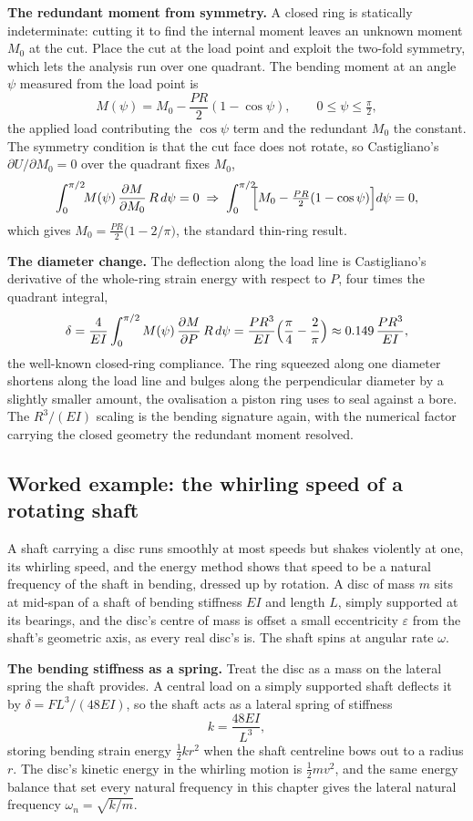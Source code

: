 \textbf{The redundant moment from symmetry.} A closed ring is statically
indeterminate: cutting it to find the internal moment leaves an unknown moment
$M_0$ at the cut. Place the cut at the load point and exploit the two-fold
symmetry, which lets the analysis run over one quadrant. The bending moment at
an angle $\psi$ measured from the load point is
\[
M(\psi) = M_0 - \frac{PR}{2}(1 - \cos\psi),
\qquad 0\le\psi\le\tfrac{\pi}{2},
\]
the applied load contributing the $\cos\psi$ term and the redundant $M_0$ the
constant. The symmetry condition is that the cut face does not rotate, so
Castigliano's $\partial U/\partial M_0 = 0$ over the quadrant fixes $M_0$,
\[
\int_0^{\pi/2}\!\! M(\psi)\,\frac{\partial M}{\partial M_0}\,R\,d\psi = 0
\;\Rightarrow\;
\int_0^{\pi/2}\!\!\Bigl[M_0 - \tfrac{PR}{2}(1-\cos\psi)\Bigr]d\psi = 0,
\]
which gives $M_0 = \tfrac{PR}{2}\bigl(1 - 2/\pi\bigr)$, the standard
thin-ring result.

\textbf{The diameter change.} The deflection along the load line is
Castigliano's derivative of the whole-ring strain energy with respect to $P$,
four times the quadrant integral,
\[
\delta = \frac{4}{EI}\int_0^{\pi/2} M(\psi)\,
\frac{\partial M}{\partial P}\,R\,d\psi
= \frac{PR^3}{EI}\Bigl(\frac{\pi}{4} - \frac{2}{\pi}\Bigr)
\approx 0.149\,\frac{PR^3}{EI},
\]
the well-known closed-ring compliance. The ring squeezed along one diameter
shortens along the load line and bulges along the perpendicular diameter by a
slightly smaller amount, the ovalisation a piston ring uses to seal against a
bore. The $R^3/(EI)$ scaling is the bending signature again, with the numerical
factor carrying the closed geometry the redundant moment resolved.

\subsection{Worked example: the whirling speed of a rotating shaft}

A shaft carrying a disc runs smoothly at most speeds but shakes violently at
one, its whirling speed, and the energy method shows that speed to be a
natural frequency of the shaft in bending, dressed up by rotation. A disc of
mass $m$ sits at mid-span of a shaft of bending stiffness $EI$ and length
$L$, simply supported at its bearings, and the disc's centre of mass is
offset a small eccentricity $\varepsilon$ from the shaft's geometric axis, as
every real disc's is. The shaft spins at angular rate $\omega$.

\textbf{The bending stiffness as a spring.} Treat the disc as a mass on the
lateral spring the shaft provides. A central load on a simply supported shaft
deflects it by $\delta = FL^3/(48EI)$, so the shaft acts as a lateral spring
of stiffness
\[
k = \frac{48EI}{L^3},
\]
storing bending strain energy $\tfrac12 k r^2$ when the shaft centreline
bows out to a radius $r$. The disc's kinetic energy in the whirling motion is
$\tfrac12 m v^2$, and the same energy balance that set every natural
frequency in this chapter gives the lateral natural frequency
$\omega_n = \sqrt{k/m}$.

